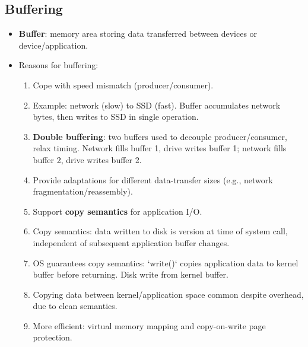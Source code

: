 \subsection{Buffering}
\begin{itemize}
    \item \textbf{Buffer}: memory area storing data transferred between devices or device/application.
    \item Reasons for buffering:
    \begin{enumerate}
        \item Cope with speed mismatch (producer/consumer).
        \item Example: network (slow) to SSD (fast). Buffer accumulates network bytes, then writes to SSD in single operation.
        \item \textbf{Double buffering}: two buffers used to decouple producer/consumer, relax timing. Network fills buffer 1, drive writes buffer 1; network fills buffer 2, drive writes buffer 2.
        \item Provide adaptations for different data-transfer sizes (e.g., network fragmentation/reassembly).
        \item Support \textbf{copy semantics} for application I/O.
        \item Copy semantics: data written to disk is version at time of system call, independent of subsequent application buffer changes.
        \item OS guarantees copy semantics: `write()` copies application data to kernel buffer before returning. Disk write from kernel buffer.
        \item Copying data between kernel/application space common despite overhead, due to clean semantics.
        \item More efficient: virtual memory mapping and copy-on-write page protection.
    \end{enumerate}
\end{itemize}

